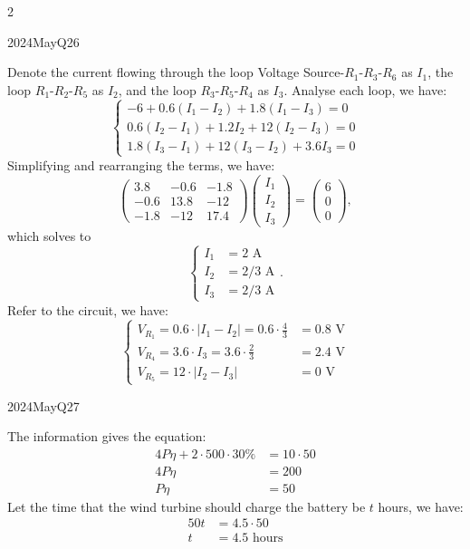 \begin{multicols}{2}
\begin{qsolution}{2024}{May}{Q26}{\tgEE \tgEECircuitAnalysis \tgEEResistors}

    Denote the current flowing through the loop Voltage Source-$R_1$-$R_3$-$R_6$ as $I_1$, the loop $R_1$-$R_2$-$R_5$ as $I_2$, and the loop $R_3$-$R_5$-$R_4$ as $I_3$.
    Analyse each loop, we have:
    \[
    \begin{cases}
        -6+0.6(I_1-I_2)+1.8(I_1-I_3)=0\\
        0.6(I_2-I_1)+1.2I_2+12(I_2-I_3)=0\\
        1.8(I_3-I_1)+12(I_3-I_2)+3.6I_3=0
    \end{cases}
    \]
    Simplifying and rearranging the terms, we have:
    \[
    \begin{pmatrix}
        3.8 & -0.6 & -1.8 \\
        -0.6 & 13.8 & -12 \\
        -1.8 & -12 & 17.4
    \end{pmatrix} \begin{pmatrix}
        I_1 \\ I_2 \\ I_3
    \end{pmatrix} = \begin{pmatrix}
        6 \\ 0 \\ 0
    \end{pmatrix},
    \]
    which solves to
    \[
        \begin{cases}
            I_1 &= 2\text{ A}\\
            I_2 &= 2/3\text{ A}\\
            I_3 &= 2/3\text{ A}
        \end{cases}.
    \]
    Refer to the circuit, we have:
    \[
    \begin{cases}
        V_{R_1}=0.6\cdot|I_1-I_2|=0.6\cdot\frac{4}{3}&=\boxed{0.8\text{ V}} \\
        V_{R_4}=3.6\cdot I_3=3.6\cdot\frac{2}{3}&=\boxed{2.4\text{ V}} \\
        V_{R_5}=12\cdot|I_2-I_3|&=\boxed{0\text{ V}}
    \end{cases}
    \]
\end{qsolution}

\begin{qsolution}{2024}{May}{Q27}{\tgEE \tgEEPowerSystems}

    The information gives the equation:
    \begin{align*}
        4P\eta + 2\cdot500\cdot30\%&=10\cdot50 \\
        4P\eta&=200\\
        P\eta&=50
    \end{align*}
    Let the time that the wind turbine should charge the battery be $t$ hours, we have:
    \begin{align*}
        50t&=4.5\cdot50\\
        t&=4.5\text{ hours}
    \end{align*}
\end{qsolution}


\end{multicols}
